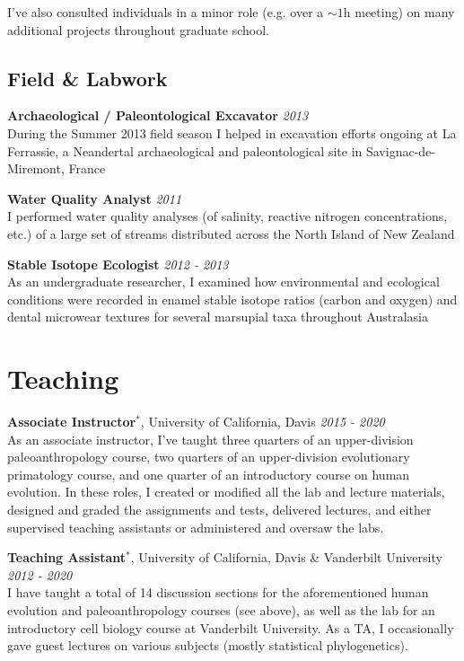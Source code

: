 \documentclass[12pt]{article}
\begin{document}
I've also consulted individuals in a minor role (e.g. over a $\sim 1$h meeting) on many additional projects throughout graduate school.

\subsection{Field \& Labwork}

\textbf{Archaeological / Paleontological Excavator} \hfill \emph{2013}\\
During the Summer 2013 field season I helped in excavation efforts ongoing at La Ferrassie, a Neandertal archaeological and paleontological site in Savignac-de-Miremont, France


\textbf{Water Quality Analyst} \hfill \emph{2011}\\
I performed water quality analyses (of salinity, reactive nitrogen concentrations, etc.) of a large set of streams distributed across the North Island of New Zealand

\textbf{Stable Isotope Ecologist} \hfill \emph{2012 - 2013}\\
As an undergraduate researcher, I examined how environmental and ecological conditions were recorded in enamel stable isotope ratios (carbon and oxygen) and dental microwear textures for several marsupial taxa throughout Australasia

\section{Teaching}

\textbf{Associate Instructor$^{*}$}, University of California, Davis \hfill \emph{2015  - 2020}\\
As an associate instructor, I’ve taught three quarters of an upper-division paleoanthropology course, two quarters of an upper-division evolutionary primatology course, and one quarter of an introductory course on human evolution. In these roles, I created or modified all the lab and lecture materials, designed and graded the assignments and tests, delivered lectures, and either supervised teaching assistants or administered and oversaw the labs.

\textbf{Teaching Assistant$^{*}$}, University of California, Davis \& Vanderbilt University \hfill \emph{2012  - 2020}\\
I have taught a total of 14 discussion sections for the aforementioned human evolution and paleoanthropology courses (see above), as well as the lab for an introductory cell biology course at Vanderbilt University. As a TA, I occasionally gave guest lectures on various subjects (mostly statistical phylogenetics).
\end{document}
